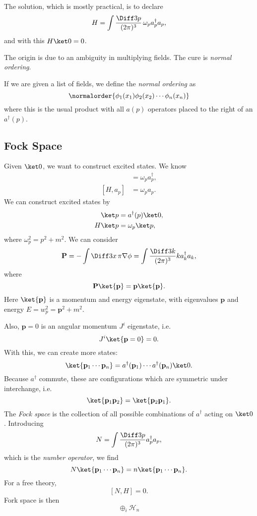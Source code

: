 \documentclass[12pt]{article}
\begin{document}
The solution, which is mostly practical, is to declare
\[
H = \int \frac{\Diff 3 p}{(2 \pi)^3} \, \omega_p a_p^\dagger a_p,
\]
and with this $H \ket 0 = 0$.

The origin is due to an ambiguity in multiplying fields. The cure is \emph{normal ordering}.

\begin{definition}
	If we are given a list of fields, we define the \emph{normal ordering} as
	\[
		\normalorder{\phi_1(x_1) \phi_2(x_2) \cdots \phi_n(x_n)}
	\]
	where this is the usual product with all $a(p)$ operators placed to the right of an $a^\dagger(p)$.
\end{definition}

\subsection{Fock Space}%
\label{sub:fs}

Given $\ket 0$, we want to construct excited states. We know
\begin{align*}
	[H, a_p^\dagger] &= \omega_p a_p^\dagger, \\
	[H, a_p] &= \omega_p a_p.
\end{align*}
We can construct excited states by
\begin{align*}
	\ket p &= a^\dagger(p) \ket 0, \\
	H \ket p &= \omega_p \ket p,
\end{align*}
where $\omega_p^2 = p^2 + m^2$. We can consider
\[
\mathbf{P} = - \int \Diff3 x \, \pi \nabla \phi = \int \frac{\Diff 3 k}{(2 \pi)^3} k a_k^\dagger a_k,
\]
where
\[
	\mathbf{P}\ket{\mathbf{p}}= \mathbf{p} \ket{\mathbf{p}}.
\]
Here $\ket{\mathbf{p}}$ is a momentum and energy eigenstate, with eigenvalues $\mathbf{p}$ and energy $E = w_p^2 = \mathbf{p}^2 + m^2$.

Also, $\mathbf{p} = 0$ is an angular momentum $J^i$ eigenstate, i.e.
\[
	J^i \ket{\mathbf{p} = 0} = 0.
\]
With this, we can create more states:
\[
	\ket{\mathbf{p}_1 \cdots \mathbf{p}_n} = a^{\dagger}(\mathbf{p}_1) \cdots a^{\dagger}(\mathbf{p}_n) \ket 0.
\]
Because $a^\dagger$ commute, these are configurations which are symmetric under interchange, i.e.
\[
	\ket{\mathbf{p}_1 \mathbf{p}_2} = \ket{\mathbf{p}_2 \mathbf{p}_1}.
\]
The \emph{Fock space} is the collection of all possible combinations of $a^\dagger$ acting on $\ket 0$. Introducing
\[
N = \int\frac{\Diff 3p}{(2\pi)^3} a_p^\dagger a_p,
\]
which is the \emph{number operator}, we find
\[
	N \ket{\mathbf{p}_1 \cdots \mathbf{p}_n} = n \ket{\mathbf{p}_1 \cdots \mathbf{p}_n}.
\]
For a free theory,
\[
	[N, H] = 0.
\]
Fork space is then
\[
\oplus_i \mathcal{H}_n
\]
\end{document}
